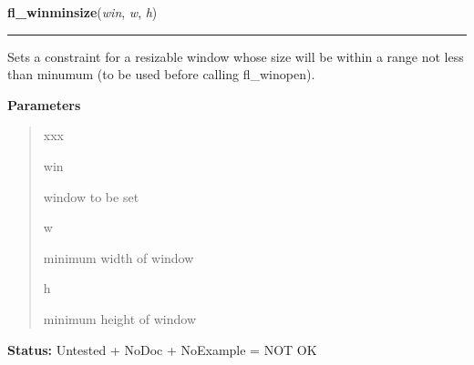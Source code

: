     \label{xformslib:library:fl_winminsize}

    \vspace{0.5ex}

\hspace{.8\funcindent}\begin{boxedminipage}{\funcwidth}

    \raggedright \textbf{fl\_winminsize}(\textit{win}, \textit{w}, \textit{h})

    \vspace{-1.5ex}

    \rule{\textwidth}{0.5\fboxrule}
\setlength{\parskip}{2ex}
    Sets a constraint for a resizable window whose size will be within a 
    range not less than minumum (to be used before calling fl\_winopen).

\setlength{\parskip}{1ex}
      \textbf{Parameters}
      \vspace{-1ex}

      \begin{quote}
        \begin{Ventry}{xxx}

          \item[win]

          window to be set

          \item[w]

          minimum width of window

          \item[h]

          minimum height of window

        \end{Ventry}

      \end{quote}

\textbf{Status:} Untested + NoDoc + NoExample = NOT OK



    \end{boxedminipage}

    \label{xformslib:library:fl_winmaxsize}

    \vspace{0.5ex}

